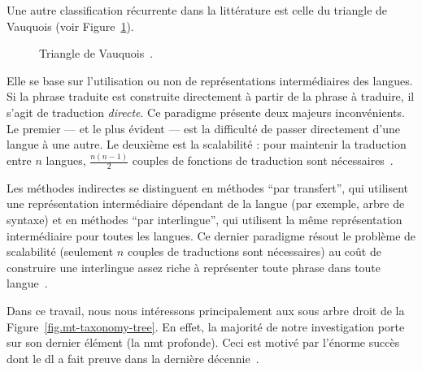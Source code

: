 Une autre classification récurrente dans la littérature 
est celle du triangle de Vauquois (voir Figure~\ref{fig.vauquois-triangle}).
\begin{figure}[hbt]
    \begin{center}
        
    \end{center}
    \caption[Triangle de Vauquois.]
    {Triangle de Vauquois~\cite{hybrid-mt}.}
    \label{fig.vauquois-triangle}
\end{figure}
Elle se base sur l'utilisation ou non de représentations intermédiaires des langues.
Si la phrase traduite est construite directement à partir de la phrase à traduire,
il s'agit de traduction \emph{directe}.
Ce paradigme présente deux majeurs inconvénients.
Le premier --- et le plus évident --- est la difficulté de passer directement d'une langue à une autre.
Le deuxième est la scalabilité : pour maintenir la traduction entre \(n\) langues,
\(\frac{n(n - 1)}{2}\) couples de fonctions de traduction sont nécessaires~\cite{routledge}.

Les méthodes indirectes se distinguent en méthodes ``par transfert'', 
qui utilisent une représentation intermédiaire dépendant de la langue (par exemple, arbre de syntaxe)
et en méthodes ``par interlingue'',
qui utilisent la même représentation intermédiaire pour toutes les langues.
Ce dernier paradigme résout le problème de scalabilité 
(seulement \(n\) couples de traductions sont nécessaires)
au coût de construire une interlingue assez riche à représenter toute phrase dans toute langue~\cite{routledge}.

Dans ce travail, 
nous nous intéressons principalement aux sous arbre droit de la Figure~\ref{fig.mt-taxonomy-tree}.
En effet, la majorité de notre investigation porte sur son dernier élément (la \gls{nmt} profonde).
Ceci est motivé par l'énorme succès 
dont le \gls{dl} a fait preuve dans la dernière décennie~\cite{Raschka_Mirjalili_2017}.
